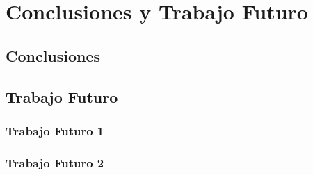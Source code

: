 \chapter{Conclusiones y Trabajo Futuro}


\section{Conclusiones}


\section{Trabajo Futuro}

\subsection*{Trabajo Futuro 1}

\subsection*{Trabajo Futuro 2}


